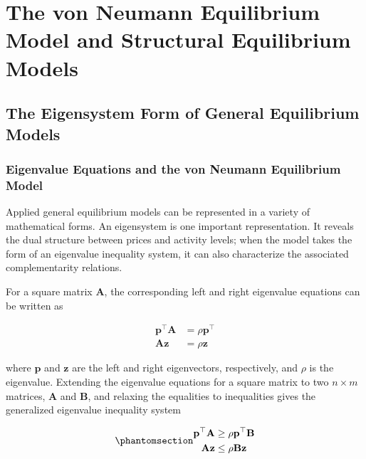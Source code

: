 \documentclass[
  letterpaper,
  DIV=11,
  numbers=noendperiod]{scrreprt}
\begin{document}

\chapter{The von Neumann Equilibrium Model and Structural Equilibrium
Models}\label{the-von-neumann-equilibrium-model-and-structural-equilibrium-models}

\section{The Eigensystem Form of General Equilibrium
Models}\label{the-eigensystem-form-of-general-equilibrium-models}

\subsection{Eigenvalue Equations and the von Neumann Equilibrium
Model}\label{eigenvalue-equations-and-the-von-neumann-equilibrium-model}

Applied general equilibrium models can be represented in a variety of
mathematical forms. An eigensystem is one important representation. It
reveals the dual structure between prices and activity levels; when the
model takes the form of an eigenvalue inequality system, it can also
characterize the associated complementarity relations.

For a square matrix \(\mathbf A\), the corresponding left and right
eigenvalue equations can be written as

\[
\begin{aligned}
\mathbf p^{\top}\mathbf A
&=\rho\mathbf p^{\top}\\
\mathbf A\mathbf z
&=\rho\mathbf z
\end{aligned}
\]

where \(\mathbf p\) and \(\mathbf z\) are the left and right
eigenvectors, respectively, and \(\rho\) is the eigenvalue. Extending
the eigenvalue equations for a square matrix to two \(n\times m\)
matrices, \(\mathbf A\) and \(\mathbf B\), and relaxing the equalities
to inequalities gives the generalized eigenvalue inequality system

\begin{equation}\phantomsection\label{eq-vonNeumannModel}{
\begin{aligned}
\mathbf p^{\top}\mathbf A
&\geq\rho\mathbf p^{\top}\mathbf B\\
\mathbf A\mathbf z
&\leq\rho\mathbf B\mathbf z
\end{aligned}
}\end{equation}
\end{document}
